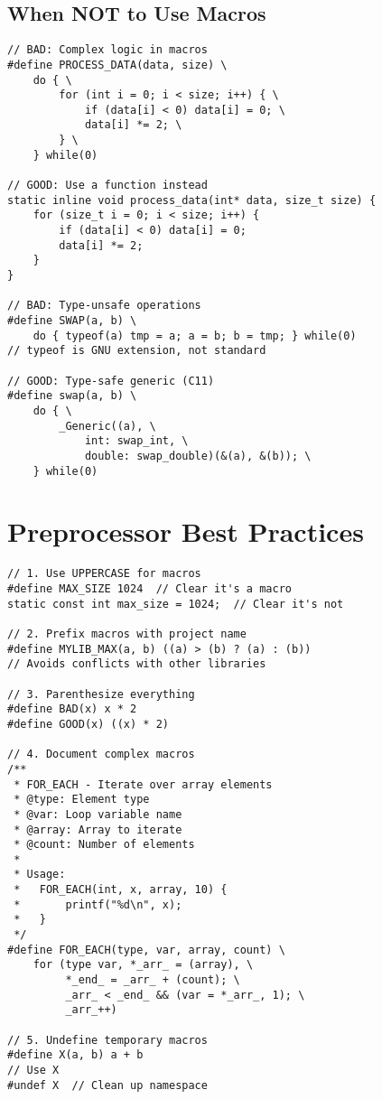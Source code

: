 \subsection{When NOT to Use Macros}

\begin{lstlisting}
// BAD: Complex logic in macros
#define PROCESS_DATA(data, size) \
    do { \
        for (int i = 0; i < size; i++) { \
            if (data[i] < 0) data[i] = 0; \
            data[i] *= 2; \
        } \
    } while(0)

// GOOD: Use a function instead
static inline void process_data(int* data, size_t size) {
    for (size_t i = 0; i < size; i++) {
        if (data[i] < 0) data[i] = 0;
        data[i] *= 2;
    }
}

// BAD: Type-unsafe operations
#define SWAP(a, b) \
    do { typeof(a) tmp = a; a = b; b = tmp; } while(0)
// typeof is GNU extension, not standard

// GOOD: Type-safe generic (C11)
#define swap(a, b) \
    do { \
        _Generic((a), \
            int: swap_int, \
            double: swap_double)(&(a), &(b)); \
    } while(0)
\end{lstlisting}

\section{Preprocessor Best Practices}

\begin{lstlisting}
// 1. Use UPPERCASE for macros
#define MAX_SIZE 1024  // Clear it's a macro
static const int max_size = 1024;  // Clear it's not

// 2. Prefix macros with project name
#define MYLIB_MAX(a, b) ((a) > (b) ? (a) : (b))
// Avoids conflicts with other libraries

// 3. Parenthesize everything
#define BAD(x) x * 2
#define GOOD(x) ((x) * 2)

// 4. Document complex macros
/**
 * FOR_EACH - Iterate over array elements
 * @type: Element type
 * @var: Loop variable name
 * @array: Array to iterate
 * @count: Number of elements
 *
 * Usage:
 *   FOR_EACH(int, x, array, 10) {
 *       printf("%d\n", x);
 *   }
 */
#define FOR_EACH(type, var, array, count) \
    for (type var, *_arr_ = (array), \
         *_end_ = _arr_ + (count); \
         _arr_ < _end_ && (var = *_arr_, 1); \
         _arr_++)

// 5. Undefine temporary macros
#define X(a, b) a + b
// Use X
#undef X  // Clean up namespace
\end{lstlisting}

